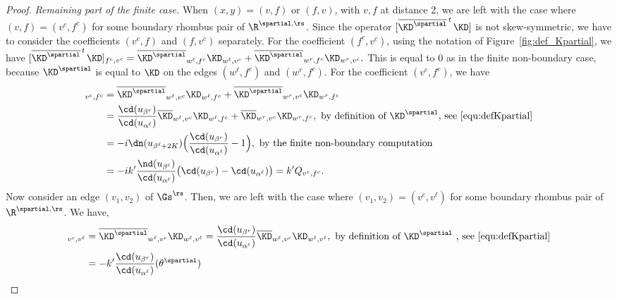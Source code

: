 \documentclass[a4paper,twoside,11pt]{article}
\begin{document}
\begin{proof}
\emph{Remaining part of the finite case.}
When $(x,y)=(v,f)$ or $(f,v)$, with $v,f$ at distance 2, we are left with the case where $(v,f)=(v^c,f^c)$ for some boundary rhombus pair 
of $\R^{\spartial,\rs}$. 
Since the operator $[{\overline{\KD^\spartial}}^{\,t\,}\KD]$ is not skew-symmetric, 
we have to consider the coefficients $(v^c,f)$ and $(f,v^c)$ separately. 
For the coefficient $(f^c,v^c)$, using the notation of Figure~\ref{fig:def_Kpartial}, we have
$
[{\overline{\KD^\spartial}}^{\,t\,}\KD]_{f^c,v^c}=\overline{\KD^\spartial}_{w^\ell,f^c}\KD_{w^\ell,v^c}+
\overline{\KD^\spartial}_{w^r,f^c}\KD_{w^r,v^c}.
$
This is equal to 0 as in the finite non-boundary case, 
because $\KD^\spartial$ is equal to $\KD$ on the edges $(w^\ell,f^c)$ and $(w^r,f^c)$. 
For the coefficient $(v^c,f^c)$, we have
\begin{align*}
[{\overline{\KD^\spartial}}^{\,t\,}\KD]_{v^c,f^c}&=
\overline{\KD^\spartial}_{w^\ell,v^c}\KD_{w^\ell,f^c}+\overline{\KD^\spartial}_{w^r,v^c}\KD_{w^r,f^c}\\
&=\frac{\cd(u_{\beta^r})}{\cd(u_{\alpha^\ell})}\overline{\KD}_{w^\ell,v^c}\KD_{w^\ell,f^c}+\overline{\KD}_{w^r,v^c}\KD_{w^r,f^c},
\text{ by definition of $\KD^\spartial$, see~\eqref{equ:defKpartial}}\\
&=-i\dn(u_{\beta^\ell+2K})\Bigl(\frac{\cd(u_{\beta^r})}{\cd(u_{\alpha^\ell})}-1\Bigr),\text{ by the finite non-boundary computation}\\
&=-ik'\frac{\nd(u_{\beta^\ell})}{\cd(u_{\alpha^\ell})}\bigl(\cd(u_{\beta^r})-\cd(u_{\alpha^\ell})\bigr)=k'Q_{v^c,f^c}.
\end{align*}
Now consider an edge $(v_1,v_2)$ of $\Gs^\rs$. Then, we are left with the case where $(v_1,v_2)=(v^c,v^\ell)$
for some boundary rhombus pair of $\R^{\spartial,\rs}$. We have,
\begin{align*}
[{\overline{\KD^\spartial}}^{\,t\,}\KD]_{v^c,v^\ell}&=\overline{\KD^\spartial}_{w^\ell,v^c}\KD_{w^\ell,v^\ell}
=\frac{\cd(u_{\beta^r})}{\cd(u_{\alpha^\ell})}\overline{\KD}_{w^\ell,v^c}\KD_{w^\ell,v^\ell},\text{ by definition of $\KD^\spartial$
, see~\eqref{equ:defKpartial}}\\
&=-k'\frac{\cd(u_{\beta^r})}{\cd(u_{\alpha^\ell})}\sc(\theta^\spartial)

\end{align*}
\end{proof}
\end{document}
